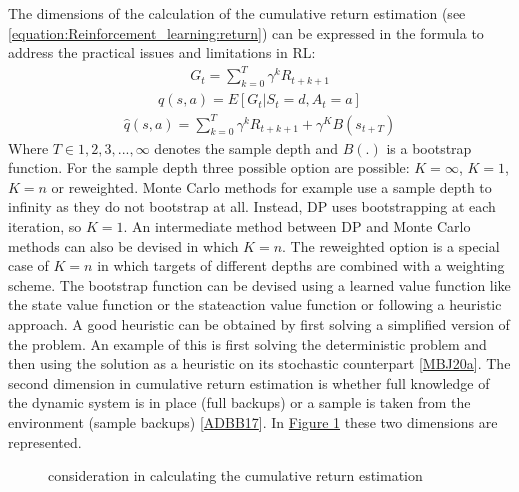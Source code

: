 \documentclass[letterpaper,10pt,english]{jupyterBook}
\let\sphinxpxdimen\pdfpxdimen\else\newdimen\sphinxpxdimen
\begin{document}
\sphinxAtStartPar
The dimensions of the calculation of the cumulative return estimation (see \eqref{equation:Reinforcement_learning:return}) can be expressed in the formula to address the practical issues and limitations in RL:
\begin{equation*}
\begin{split} G_t = \sum_{k=0}^T\gamma^kR_{t+k+1} \end{split}
\end{equation*}\begin{equation*}
\begin{split} q(s,a) = E[G_t| S_t = d, A_t = a]\end{split}
\end{equation*}\begin{equation*}
\begin{split} \hat{q}(s,a) = \sum_{k=0}^T \gamma^kR_{t+k+1} + \gamma^KB(s_{t+T}) \end{split}
\end{equation*}
\sphinxAtStartPar
Where \(T \in {1,2,3, ..., \infty}\) denotes the sample depth and \(B(.)\) is a bootstrap function. For the sample depth three possible option are possible: \(K = \infty\), \(K = 1\),  \(K = n\) or reweighted. Monte Carlo methods for example use a sample depth to infinity as they do not bootstrap at all. Instead, DP uses bootstrapping at each iteration, so \(K = 1\). An intermediate method between DP and Monte Carlo methods can also be devised in which \( K = n\). The reweighted option is a special case of \( K = n\) in which targets of different depths are combined with a weighting scheme. The bootstrap function can be devised using a learned value function like the state value function or the state\sphinxhyphen{}action value function or following a heuristic approach. A good heuristic can be obtained by first solving a simplified version of the problem. An example of this is first solving the deterministic problem and then using the solution as a heuristic on its stochastic counterpart {[}\hyperlink{cite.Discussion:id7}{MBJ20a}{]}. The second dimension in cumulative return estimation is whether full knowledge of the dynamic system is in place (full backups) or a sample is taken from the environment (sample backups) {[}\hyperlink{cite.Discussion:id63}{ADBB17}{]}. In \hyperref[\detokenize{Reinforcement_learning:backups-bootstrap-fig}]{Figure \ref{\detokenize{Reinforcement_learning:backups-bootstrap-fig}}} these two dimensions are represented.

\begin{figure}[htbp]
\centering
\capstart

\noindent\sphinxincludegraphics[width=300\sphinxpxdimen,height=250\sphinxpxdimen]{{backups}.png}
\caption{consideration in calculating the cumulative return estimation}\label{\detokenize{Reinforcement_learning:backups-bootstrap-fig}}\end{figure}
\end{document}
